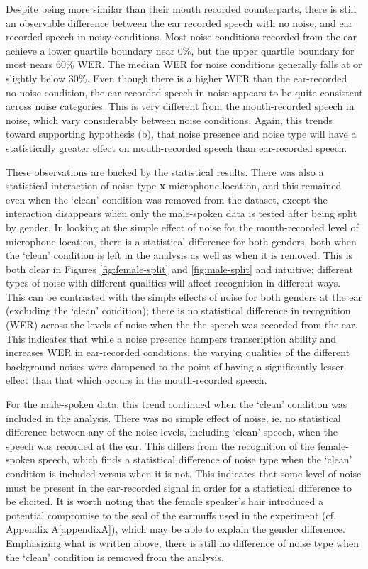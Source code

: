 Despite being more similar than their mouth recorded counterparts, there is still an observable difference between the ear recorded speech with no noise, and ear recorded speech in noisy conditions.  Most noise conditions recorded from the ear achieve a lower quartile boundary near 0\%, but the upper quartile boundary for most nears 60\% WER.  The median WER for noise conditions generally falls at or slightly below 30\%. 
Even though there is a higher WER than the ear-recorded no-noise condition, the ear-recorded speech in noise appears to be quite consistent across noise categories.  This is very different from the mouth-recorded speech in noise, which vary considerably between noise conditions. Again, this trends toward supporting hypothesis (b), that noise presence and noise type will have a statistically greater effect on mouth-recorded speech than ear-recorded speech.

These observations are backed by the statistical results.  There was also a statistical interaction of noise type \textbf{x} microphone location, and this remained even when the `clean' condition was removed from the dataset, except the interaction disappears when only the male-spoken data is tested after being split by gender.  In looking at the simple effect of noise for the mouth-recorded level of microphone location, there is a statistical difference for both genders, both when the `clean' condition is left in the analysis as well as when it is removed.  This is both clear in Figures \ref{fig:female-split} and \ref{fig:male-split} and intuitive; different types of noise with different qualities will affect recognition in different ways.  This can be contrasted with the simple effects of noise for both genders at the ear (excluding the `clean' condition); there is no statistical difference in recognition (WER) across the levels of noise when the the speech was recorded from the ear.  This indicates that while a noise presence hampers transcription ability and increases WER in ear-recorded conditions, the varying qualities of the different background noises were dampened to the point of having a significantly lesser effect than that which occurs in the mouth-recorded speech.

For the male-spoken data, this trend continued when the `clean' condition was included in the analysis.  There was no simple effect of noise, ie. no statistical difference between any of the noise levels, including `clean' speech, when the speech was recorded at the ear.  This differs from the recognition of the female-spoken speech, which finds a statistical difference of noise type when the `clean' condition is included versus when it is not.  This indicates that some level of noise must be present in the ear-recorded signal in order for a statistical difference to be elicited.  It is worth noting that the female speaker's hair introduced a potential compromise to the seal of the earmuffs used in the experiment (cf. Appendix A\ref{appendixA}), which may be able to explain the gender difference. Emphasizing what is written above, there is still no difference of noise type when the `clean' condition is removed from the analysis.

